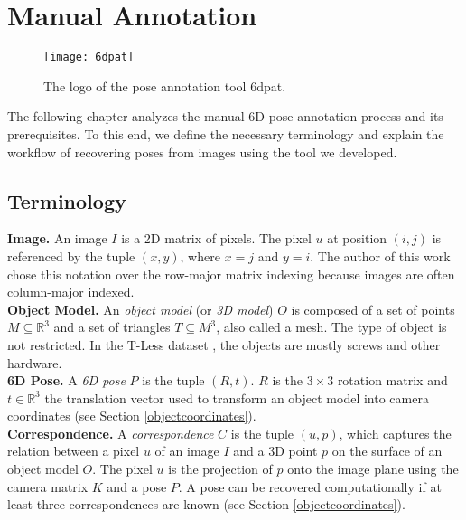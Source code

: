 \chapter{Manual Annotation} \label{chapter:manual_annotation}

\begin{figure}[!tbp]
	\centering
    \texttt{[image: 6dpat]}
    \caption{The logo of the pose annotation tool \ac{6dpat}.}
    	\label{fig:6dpat_logo}
\end{figure} 

The following chapter analyzes the manual 6D pose annotation process and its prerequisites. To this end, we define the necessary terminology and explain the workflow of recovering poses from images using the tool we developed. 

\section{Terminology} \label{section:terminology}

\textbf{Image.} An image $I$ is a 2D matrix of pixels. The pixel $u$ at position $(i, j)$ is referenced by the tuple $(x, y)$, where $x = j$ and $y = i$. The author of this work chose this notation over the row-major matrix indexing because images are often column-major indexed. \\

\noindent\textbf{Object Model.} An \textit{object model} (or \textit{3D model}) $O$ is composed of a set of points $M \subseteq \mathbb{R}^3$ and a set of triangles $T \subseteq M^3$, also called a mesh. The type of object is not restricted. In the T-Less dataset \cite{tless}, the objects are mostly screws and other hardware. \\

\noindent\textbf{6D Pose.} A \textit{6D pose} $P$ is the tuple $(R, t)$. $R$ is the $3\times 3$ rotation matrix and $t \in \mathbb{R}^3$ the translation vector used to transform an object model into camera coordinates (see Section \ref{objectcoordinates}). \\

\noindent\textbf{Correspondence.} A \textit{correspondence} $C$ is the tuple $(u, p)$, which captures the relation between a pixel $u$ of an image $I$ and a 3D point $p$ on the surface of an object model $O$. The pixel $u$ is the projection of $p$ onto the image plane using the camera matrix $K$ and a pose $P$. A pose can be recovered computationally if at least three correspondences are known (see Section \ref{objectcoordinates}). \\

